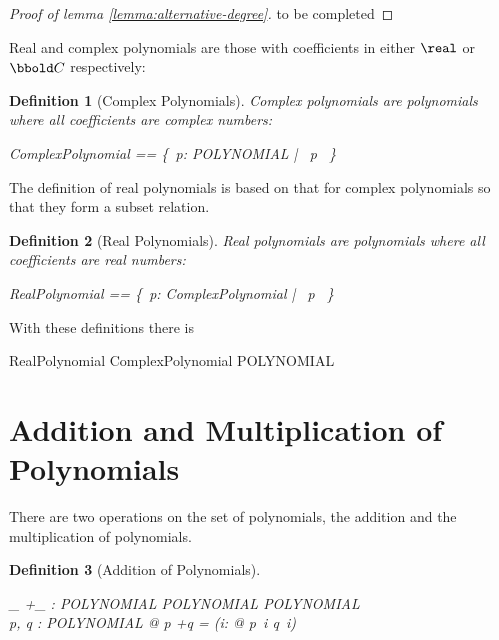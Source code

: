 \documentclass[12pt]{scrartcl}
\newtheorem{zdef}{Definition}[section]
\begin{document}
\begin{proof}[Proof of lemma \ref{lemma:alternative-degree}]
  to  be completed
\end{proof}
%
Real and complex polynomials are those with coefficients in either
$\real$ or $\complex$ respectively:
\begin{zdef}[Complex Polynomials]
  \label{zdef:complex-polynomials}
  \emph{Complex polynomials} are polynomials where all coefficients
  are complex numbers:
  \begin{zed}
    ComplexPolynomial == \{~p: POLYNOMIAL | \ran~p \subseteq \complex~\}
  \end{zed}
\end{zdef}
%
The definition of real polynomials is based on that for complex
polynomials so that they form a subset relation.
\begin{zdef}[Real Polynomials]
  \label{zdef:real-polynomials}
  Real polynomials are polynomials where all coefficients are real numbers:
  \begin{zed}
    RealPolynomial == \{~p: ComplexPolynomial | \ran~p \subseteq \real~\}
  \end{zed}
\end{zdef}
%
With these definitions there is
\begin{zed}
  RealPolynomial \subseteq ComplexPolynomial \subseteq POLYNOMIAL
\end{zed}
%
\section{Addition and Multiplication of Polynomials}
\label{sec:addition-multiplication}
There are two operations on the set of polynomials, the addition and
the multiplication of polynomials.
\newcommand{\polyplus}{+}
\begin{zdef}[Addition of Polynomials]
  \label{zdef:polynomial-addition}
  \begin{axdef}
    \_ \polyplus \_ : POLYNOMIAL \cross POLYNOMIAL \fun POLYNOMIAL\\
    \where
    \forall p, q : POLYNOMIAL @ p \polyplus q = (\lambda i: \nat @ p~i
    \aplus q~i)
  \end{axdef}
\end{zdef}
\end{document}
